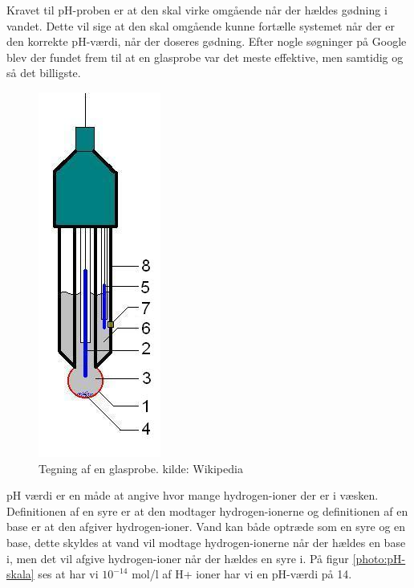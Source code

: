 
Kravet til pH-proben er at den skal virke omgående når der hældes gødning i vandet. Dette vil sige at den skal omgående kunne fortælle systemet når der er den korrekte pH-værdi, når der doseres gødning. Efter nogle søgninger på Google blev der fundet frem til at en glasprobe var det meste effektive, men samtidig og så det billigste. 

\begin{figure}[H]
	\centering 
	\includegraphics[scale=0.7]{HardwareArkitektur/Sensore/pH_probe_billeder/Glass_electrode_wiki.jpg}
	\caption{Tegning af en glasprobe. kilde: Wikipedia}
	\label{photo:pH-probe}
\end{figure}     

pH værdi er en måde at angive hvor mange hydrogen-ioner der er i væsken. Definitionen af en syre er at den modtager hydrogen-ionerne og definitionen af en base er at den afgiver hydrogen-ioner. Vand kan både optræde som en syre og en base, dette skyldes at vand vil modtage hydrogen-ionerne når der hældes en base i, men det vil afgive hydrogen-ioner når der hældes en syre i. På figur \ref{photo:pH-skala} ses at har vi $10^{-14}$ mol/l af H+ ioner har vi en pH-værdi på 14. 

